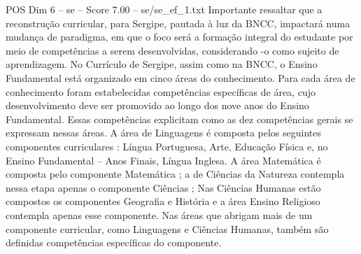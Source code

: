\begin{textsample}{POS Dim 6 – se – Score 7.00 – se/se\_ef\_1.txt}
Importante ressaltar que a reconstrução curricular, para Sergipe, pautada à luz da BNCC, impactará numa mudança de paradigma, em que o foco será a formação integral do estudante por meio de competências a serem desenvolvidas, considerando -o como sujeito de aprendizagem.
No Currículo de Sergipe, assim como na BNCC, o Ensino Fundamental está organizado em cinco áreas do conhecimento.
Para cada área de conhecimento foram estabelecidas competências específicas de área, cujo desenvolvimento deve ser promovido ao longo dos nove anos do Ensino Fundamental.
Essas competências explicitam como as dez competências gerais se expressam nessas áreas.
A área de Linguagens é composta pelos seguintes componentes curriculares : Língua Portuguesa, Arte, Educação Física e, no Ensino Fundamental – Anos Finais, Língua Inglesa.
A área Matemática é composta pelo componente Matemática ; a de Ciências da Natureza contempla nessa etapa apenas o componente Ciências ; Nas Ciências Humanas estão compostos os componentes Geografia e História e a área Ensino Religioso contempla apenas esse componente.
Nas áreas que abrigam mais de um componente curricular, como Linguagens e Ciências Humanas, também são definidas competências específicas do componente.

\end{textsample}
